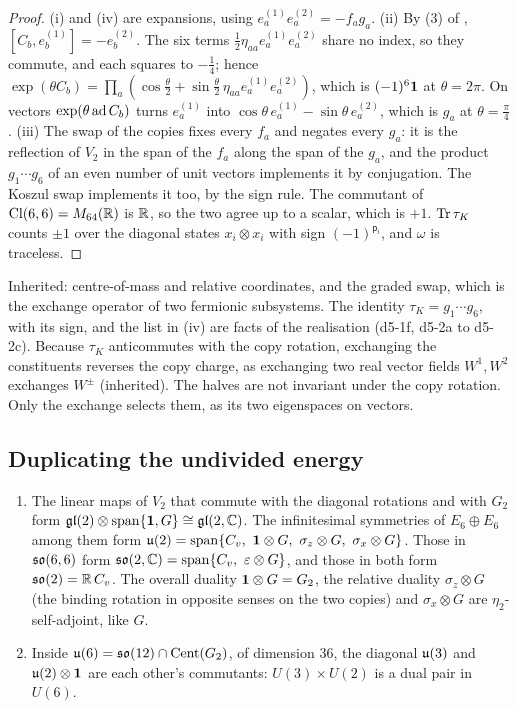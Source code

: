 \begin{proof}
(i) and (iv) are expansions, using $e^{(1)}_ae^{(2)}_a=-f_ag_a$. (ii) By (3) of \cite{ES17}, $[C_b,e^{(1)}_b]=-e^{(2)}_b$. The six terms
$\tfrac12\eta_{aa}e^{(1)}_ae^{(2)}_a$ share no index, so they commute, and each squares to $-\tfrac14$; hence
$\exp(\theta C_b)=\prod_a(\cos\tfrac\theta2+\sin\tfrac\theta2\,\eta_{aa}e^{(1)}_ae^{(2)}_a)$, which is $(-1)^6\mathbf 1$ at $\theta=2\pi$. On vectors $\exp(\theta\operatorname{ad} C_b)$ turns
$e^{(1)}_a$ into $\cos\theta\,e^{(1)}_a-\sin\theta\,e^{(2)}_a$, which is $g_a$ at $\theta=\tfrac\pi4$. (iii) The swap of the copies fixes every $f_a$ and negates every $g_a$: it is the reflection of $V_2$
in the span of the $f_a$ along the span of the $g_a$, and the product $g_1\cdots g_6$ of an even number of unit vectors implements it by conjugation. The Koszul swap implements
it too, by the sign rule. The commutant of $\mathrm{Cl}(6,6)=M_{64}(\mathbb{R})$ is $\mathbb{R}$, so the two agree up to a scalar, which is $+1$. $\operatorname{Tr}\tau_K$ counts
$\pm1$ over the diagonal states $x_i\otimes x_i$ with sign $(-1)^{\mathsf p_i}$, and $\omega$ is traceless.
\end{proof}

Inherited: centre-of-mass and relative coordinates, and the graded swap, which is the exchange operator of two fermionic subsystems. The
identity $\tau_K=g_1\cdots g_6$, with its sign, and the list in (iv) are facts of the realisation (d5-1f, d5-2a to d5-2c). Because $\tau_K$
anticommutes with the copy rotation, exchanging the constituents reverses the copy charge, as exchanging two real vector fields $W^1,W^2$
exchanges $W^\pm$ (inherited). The halves are not invariant under the copy rotation. Only the exchange selects them, as its two eigenspaces
on vectors.

\subsection{Duplicating the undivided energy}
\label{d5:sec:energy}

\begin{proposition}
\label{d5:prop:energysym}
\begin{enumerate}[label=(\roman*),leftmargin=2.2em]
\item The linear maps of $V_2$ that commute with the diagonal rotations and with $G_2$ form $\mathfrak{gl}(2)\otimes\operatorname{span}\{\mathbf 1,G\}\cong\mathfrak{gl}(2,\mathbb{C})$.
The infinitesimal symmetries of $E_6\oplus E_6$ among them form $\uu2=\operatorname{span}\{C_v,\ \id\otimes G,\ \sigma_z\otimes G,\ \sigma_x\otimes G\}$. Those
in $\mathfrak{so}(6,6)$ form $\so{2,\C}=\operatorname{span}\{C_v,\ \varepsilon\otimes G\}$, and those in both form $\mathfrak{so}(2)=\mathbb{R}\,C_v$. The overall duality $\mathbf 1\otimes G=G_2$, the
relative duality $\sigma_z\otimes G$ (the binding rotation in opposite senses on the two copies) and $\sigma_x\otimes G$ are $\eta_2$-self-adjoint,
like $G$.
\item Inside $\mathfrak{u}(6)=\mathfrak{so}(12)\cap\operatorname{Cent}(G_2)$, of dimension $36$, the diagonal $\mathfrak{u}(3)$ and $\mathfrak{u}(2)\otimes\mathbf 1$ are each other's commutants: $U(3)\times U(2)$ is
a dual pair in $U(6)$.
\end{enumerate}
\end{proposition}

